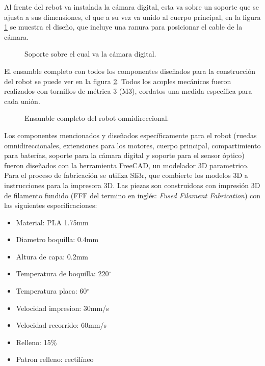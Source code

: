 \documentclass{iccmemoria}
\begin{document}
Al frente del rebot va instalada la cámara digital, esta va sobre un soporte que se ajusta a sus dimensiones, el que a su vez va unido al cuerpo principal, en la figura \ref{fig:camera_holder} se muestra el diseño, que incluye una ranura para posicionar el cable de la cámara.\\

\begin{figure}[H]
  \centering
  
  \caption[Soporte cámara digital.]{Soporte sobre el cual va la cámara digital.}
  \label{fig:camera_holder}
\end{figure}

El ensamble completo con todos los componentes diseñados para la construcción del robot se puede ver en la figura \ref{fig:robot_assembly}. Todos los acoples mecánicos fueron realizados con tornillos de métrica 3 (M3), cordatos una medida específica para cada unión.

\begin{figure}[H]
  \centering
  
  \caption[Ensamble robot omnidireccional.]{Ensamble completo del robot omnidireccional.}
  \label{fig:robot_assembly}
\end{figure}

Los componentes mencionados y diseñados específicamente para el robot (ruedas omnidireccionales, extensiones para los motores, cuerpo principal, compartimiento para baterías, soporte para la cámara digital y soporte para el sensor óptico) fueron diseñados con la herramienta FreeCAD, un modelador 3D parametrico. Para el proceso de fabricación se utiliza Sli3r, que combierte los modelos 3D a instrucciones para la impresora 3D. Las piezas son construidoas con impresión 3D de filamento fundido (FFF del termino en inglés: \emph{Fused Filament Fabrication}) con las siguientes especificaciones:\\

\begin{itemize}
	\item Material: PLA 1.75mm
	\item Diametro boquilla: 0.4mm
	\item Altura de capa: 0.2mm
	\item Temperatura de boquilla: 220$^{\circ}$
	\item Temperatura placa: 60$^{\circ}$
	\item Velocidad impresion: 30mm/s
	\item Velocidad recorrido: 60mm/s
	\item Relleno: 15\%
	\item Patron relleno: rectilíneo
\end{itemize}
\end{document}
